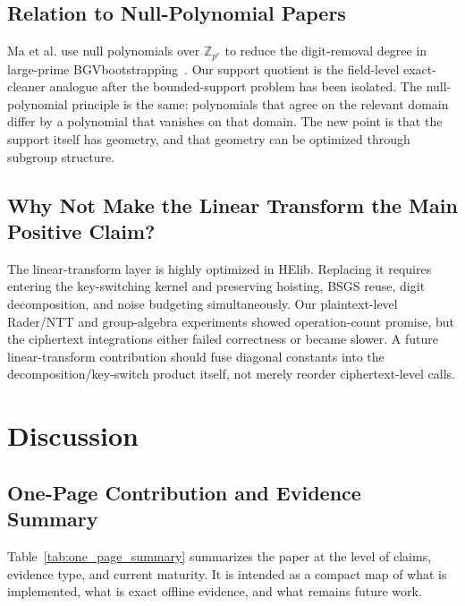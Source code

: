 \documentclass[a4paper,runningheads]{llncs}
\newcommand{\ZZ}{\mathbb{Z}}
\newcommand{\HElib}{\textsf{HElib}}
\newcommand{\BGV}{\textsf{BGV}}
\begin{document}
\subsection{Relation to Null-Polynomial Papers}

Ma et al. use null polynomials over $\ZZ_{p^e}$ to reduce the digit-removal
degree in large-prime \BGV bootstrapping~\cite{ma_large_p}.  Our support
quotient is the field-level exact-cleaner analogue after the bounded-support
problem has been isolated.  The null-polynomial principle is the same:
polynomials that agree on the relevant domain differ by a polynomial that
vanishes on that domain.  The new point is that the support itself has
geometry, and that geometry can be optimized through subgroup structure.

\subsection{Why Not Make the Linear Transform the Main Positive Claim?}

The linear-transform layer is highly optimized in \HElib.  Replacing it
requires entering the key-switching kernel and preserving hoisting, BSGS
reuse, digit decomposition, and noise budgeting simultaneously.  Our
plaintext-level Rader/NTT and group-algebra experiments showed operation-count
promise, but the ciphertext integrations either failed correctness or became
slower.  A future linear-transform contribution should fuse diagonal
constants into the decomposition/key-switch product itself, not merely
reorder ciphertext-level calls.

\section{Discussion}
\label{sec:discussion}

\subsection{One-Page Contribution and Evidence Summary}

Table~\ref{tab:one_page_summary} summarizes the paper at the level of claims,
evidence type, and current maturity. It is intended as a compact map of what is
implemented, what is exact offline evidence, and what remains future work.
\end{document}
